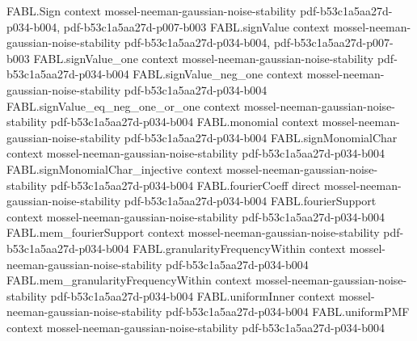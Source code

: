 \begin{theorem}
\label{FABL.tendsto_noiseStability_majority_odd}
\leanok
{}
\proofstep
  {FABL.Sign}
  {context}
  {mossel-neeman-gaussian-noise-stability}
  {pdf-b53c1a5aa27d-p034-b004,
    pdf-b53c1a5aa27d-p007-b003}
\proofstep
  {FABL.signValue}
  {context}
  {mossel-neeman-gaussian-noise-stability}
  {pdf-b53c1a5aa27d-p034-b004,
    pdf-b53c1a5aa27d-p007-b003}
\proofstep
  {FABL.signValue_one}
  {context}
  {mossel-neeman-gaussian-noise-stability}
  {pdf-b53c1a5aa27d-p034-b004}
\proofstep
  {FABL.signValue_neg_one}
  {context}
  {mossel-neeman-gaussian-noise-stability}
  {pdf-b53c1a5aa27d-p034-b004}
\proofstep
  {FABL.signValue_eq_neg_one_or_one}
  {context}
  {mossel-neeman-gaussian-noise-stability}
  {pdf-b53c1a5aa27d-p034-b004}
\proofstep
  {FABL.monomial}
  {context}
  {mossel-neeman-gaussian-noise-stability}
  {pdf-b53c1a5aa27d-p034-b004}
\proofstep
  {FABL.signMonomialChar}
  {context}
  {mossel-neeman-gaussian-noise-stability}
  {pdf-b53c1a5aa27d-p034-b004}
\proofstep
  {FABL.signMonomialChar_injective}
  {context}
  {mossel-neeman-gaussian-noise-stability}
  {pdf-b53c1a5aa27d-p034-b004}
\proofstep
  {FABL.fourierCoeff}
  {direct}
  {mossel-neeman-gaussian-noise-stability}
  {pdf-b53c1a5aa27d-p034-b004}
\proofstep
  {FABL.fourierSupport}
  {context}
  {mossel-neeman-gaussian-noise-stability}
  {pdf-b53c1a5aa27d-p034-b004}
\proofstep
  {FABL.mem_fourierSupport}
  {context}
  {mossel-neeman-gaussian-noise-stability}
  {pdf-b53c1a5aa27d-p034-b004}
\proofstep
  {FABL.granularityFrequencyWithin}
  {context}
  {mossel-neeman-gaussian-noise-stability}
  {pdf-b53c1a5aa27d-p034-b004}
\proofstep
  {FABL.mem_granularityFrequencyWithin}
  {context}
  {mossel-neeman-gaussian-noise-stability}
  {pdf-b53c1a5aa27d-p034-b004}
\proofstep
  {FABL.uniformInner}
  {context}
  {mossel-neeman-gaussian-noise-stability}
  {pdf-b53c1a5aa27d-p034-b004}
\proofstep
  {FABL.uniformPMF}
  {context}
  {mossel-neeman-gaussian-noise-stability}
  {pdf-b53c1a5aa27d-p034-b004}
\proofstep

\end{theorem}
